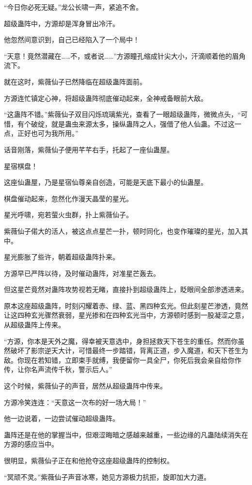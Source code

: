 \begin{this_body}
“今日你必死无疑。”龙公长啸一声，紧追不舍。

超级蛊阵中，方源却是浑身冒出冷汗。

他忽然间意识到，自己已经陷入了一个局中！

“天意！竟然潜藏在……不，或者说……”方源瞳孔缩成针尖大小，汗滴顺着他的眉角流下。

就在这时，紫薇仙子已然降临在超级蛊阵面前。

方源连忙镇定心神，将超级蛊阵彻底催动起来，全神戒备眼前大敌。

“这蛊阵不错。”紫薇仙子双目闪烁琉璃紫光，查看了一眼超级蛊阵，微微点头，“可惜，有个破绽，就是蛊虫来源太多，操纵蛊阵之人，强借了他人仙蛊。不过这一点，正好也可为我所用。”

话音刚落，紫薇仙子便用芊芊右手，托起了一座仙蛊屋。

星宿棋盘！

这座仙蛊屋，乃是星宿仙尊亲自创造，可能是天底下最小的仙蛊屋。

棋盘催动起来，忽然化作漫天晶莹的星光。

星光呼啸，宛若萤火虫群，扑上紫薇仙子。

紫薇仙子偌大的活人，被这点点星芒一扑，顿时同化，也变作璀璨的星光，加入其中。

星光膨胀了些许，朝着超级蛊阵扑来。

方源早已严阵以待，及时催动蛊阵，对准星芒轰去。

但这星芒竟然对蛊阵攻势视若无睹，直接扑到超级蛊阵上，眨眼间全部渗透进来。

原本这座超级蛊阵，时刻闪耀着赤、绿、蓝、黑四种玄光。但此刻星芒渗透，竟然让这四种玄光骤然衰弱，星光掺和在四种玄光当中，方源顿时感到一股凝涩之意，从超级蛊阵上传来。

“方源，你本是天外之魔，得幸被天意选中，身担拯救天下苍生的重任。然而你虽然破坏了影宗逆天大计，可惜最终一步踏错，背离正道，步入魔道，和天下苍生为敌。你现在若知错，立即束手就缚，我便留你一具全尸，你死后我会亲自给你作传，让你名声流传千秋，警示后人。”

这个时候，紫薇仙子的声音，居然从超级蛊阵中传来。

方源冷笑连连：“天意这一次布的好一场大局！”

他一边说着，一边尝试催动超级蛊阵。

蛊阵还是在他的掌握当中，但艰涩晦暗之感越来越重，一些边缘的凡蛊陆续消失在方源的感应当中。

很明显，紫薇仙子正在和他抢夺这座超级蛊阵的控制权。

“冥顽不灵。”紫薇仙子声音冰寒，她见方源极力抗拒，旋即加大力道。


\end{this_body}
